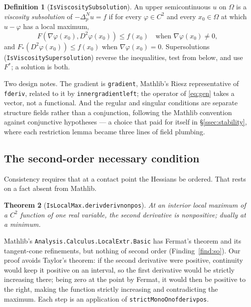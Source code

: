 \documentclass[11pt,reqno]{amsart}
\newcommand{\LEANREF}[1]{\texttt{\small\def\_{\textunderscore\allowbreak}#1}}
\newcommand{\pnlap}{\Delta_p^{N}}
\theoremstyle{plain}
\newtheorem{theorem}{Theorem}[section]
\theoremstyle{definition}
\newtheorem{definition}[theorem]{Definition}
\begin{document}
\begin{definition}[\LEANREF{IsViscositySubsolution}]\label{def:sub}
An upper semicontinuous $u$ on $\Omega$ is a \emph{viscosity subsolution} of
$-\pnlap u = f$ if for every $\varphi \in C^2$ and every $x_0 \in \Omega$ at
which $u - \varphi$ has a local maximum,
\[
  F(\nabla\varphi(x_0), D^2\varphi(x_0)) \le f(x_0)
  \quad\text{when } \nabla\varphi(x_0) \ne 0,
\]
and $F_*(D^2\varphi(x_0)) \le f(x_0)$ when $\nabla\varphi(x_0) = 0$.
Supersolutions (\LEANREF{IsViscositySupersolution}) reverse the inequalities,
test from below, and use $F^*$; a solution is both.
\end{definition}

Two design notes. The gradient is \LEANREF{gradient}, Mathlib's Riesz
representative of \LEANREF{fderiv}, related to it by
\LEANREF{inner\_gradient\_left}; the operator of \eqref{eq:gen} takes a vector,
not a functional. And the regular and singular conditions are separate
structure fields rather than a conjunction, following the Mathlib convention
against conjunctive hypotheses --- a choice that paid for itself in
\S\ref{ssec:stability}, where each restriction lemma became three lines of
field plumbing.

\subsection{The second-order necessary condition}

Consistency requires that at a contact point the Hessians be ordered. That
rests on a fact absent from Mathlib.

\begin{theorem}[\LEANREF{IsLocalMax.deriv\_deriv\_nonpos}]\label{thm:so1}
At an interior local maximum of a $C^2$ function of one real variable, the
second derivative is nonpositive; dually at a minimum.
\end{theorem}

Mathlib's \texttt{Analysis.Calculus.LocalExtr.Basic} has Fermat's theorem and
its tangent-cone refinements, but nothing of second order
(Finding~\ref{find:so}). Our proof avoids Taylor's theorem: if the second
derivative were positive, continuity would keep it positive on an interval, so
the first derivative would be strictly increasing there; being zero at the
point by Fermat, it would then be positive to the right, making the function
strictly increasing and contradicting the maximum. Each step is an application
of \LEANREF{strictMonoOn\_of\_deriv\_pos}.
\end{document}
